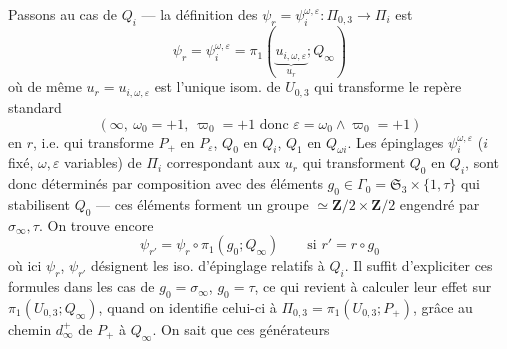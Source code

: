 \documentclass[11pt,a4paper]{article}
\begin{document}
Passons au cas de $Q_i$ — la définition \struck{\ill{}} des
$\psi_r = \psi_i^{\omega,\varepsilon} : \Pi_{0,3} \to \Pi_i$ \struck{\ill{}} est
\[
  \psi_r = \psi_i^{\omega,\varepsilon}
  = \pi_1(\underbrace{u_{i,\omega,\varepsilon}}_{u_r} ; Q_\infty)
\]
où de même $u_r = u_{i,\omega,\varepsilon}$ est l'unique isom. de $U_{0,3}$
 qui transforme le repère  standard
\[
  (\infty,\ \omega_0 = +1,\ \varpi_0 = +1 \text{ donc } \varepsilon = \omega_0 \wedge \varpi_0 = +1)
\]
en $r$, i.e. qui transforme $P_{+}$ en $P_\varepsilon$, $Q_0$ en $Q_i$, $Q_1$ en
$Q_{\omega i}$. Les épinglages $\psi_i^{\omega,\varepsilon}$ ($i$ fixé, $\omega, \varepsilon$
variables) \struck{\ill{}} de $\Pi_i$ correspondant aux $u_r$ qui transforment $Q_0$ en
$Q_i$,  sont donc déterminés par composition avec des éléments
$g_0 \in \Gamma_0 = \mathfrak{S}_3 \times \{1, \tau\}$ qui stabilisent $Q_0$ — ces éléments
\struck{\ill{}} forment un groupe $\simeq \mathbf{Z}/2 \times \mathbf{Z}/2$ engendré par
$\sigma_\infty, \tau$. On trouve encore
\[
  \psi_{r'} = \psi_r \circ \pi_1(g_0 ; Q_\infty) \qquad \text{si } r' = r \circ g_0
\]
où ici $\psi_r$, $\psi_{r'}$ désignent les iso. d'épinglage relatifs à $Q_i$. Il suffit
d'expliciter ces formules dans les cas de $g_0 = \sigma_\infty$, $g_0 = \tau$, ce qui
revient à calculer leur effet sur \struck{\ill{}} $\pi_1(U_{0,3} ; Q_\infty)$, quand on
identifie celui-ci à $\Pi_{0,3} = \pi_1(U_{0,3} ; P_{+})$, grâce au chemin $d_\infty^{+}$ de
$P_{+}$ à $Q_\infty$. On sait que ces générateurs
\end{document}
